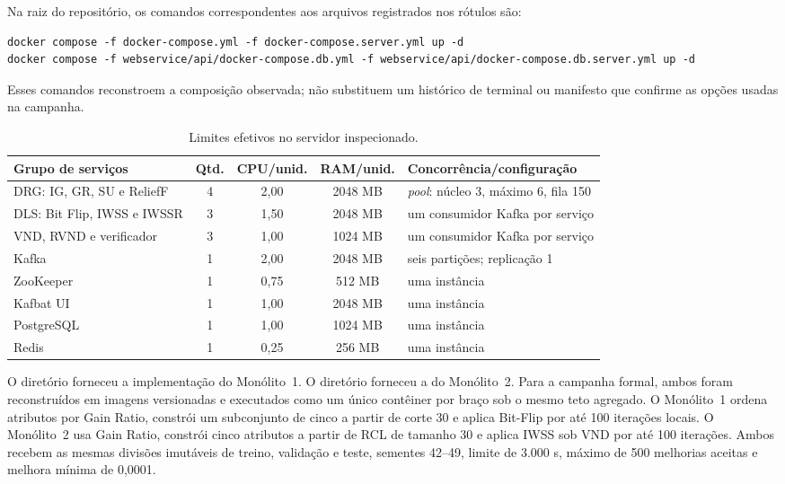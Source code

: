 Na raiz do repositório, os comandos correspondentes aos arquivos registrados nos rótulos são:
\begin{lstlisting}[basicstyle=\ttfamily\footnotesize,breaklines=true,columns=fullflexible]
docker compose -f docker-compose.yml -f docker-compose.server.yml up -d
docker compose -f webservice/api/docker-compose.db.yml -f webservice/api/docker-compose.db.server.yml up -d
\end{lstlisting}
Esses comandos reconstroem a composição observada; não substituem um histórico de terminal ou manifesto que confirme as opções usadas na campanha.

\begin{table}[!htb]
  \centering
  \scriptsize
  \caption{Limites efetivos no servidor inspecionado.}
  \label{tab:server-container-resources}
  \begin{tabularx}{\linewidth}{@{}Xc c c X@{}}
    \toprule
    \textbf{Grupo de serviços} & \textbf{Qtd.} & \textbf{CPU/unid.} & \textbf{RAM/unid.} & \textbf{Concorrência/configuração} \\
    \midrule
    DRG: IG, GR, SU e ReliefF & 4 & 2,00 & 2048 MB & \textit{pool}: núcleo 3, máximo 6, fila 150 \\
    DLS: Bit Flip, IWSS e IWSSR & 3 & 1,50 & 2048 MB & um consumidor Kafka por serviço \\
    VND, RVND e verificador & 3 & 1,00 & 1024 MB & um consumidor Kafka por serviço \\
    Kafka & 1 & 2,00 & 2048 MB & seis partições; replicação 1 \\
    ZooKeeper & 1 & 0,75 & 512 MB & uma instância \\
    Kafbat UI & 1 & 1,00 & 2048 MB & uma instância \\
    PostgreSQL & 1 & 1,00 & 1024 MB & uma instância \\
    Redis & 1 & 0,25 & 256 MB & uma instância \\
    \bottomrule
  \end{tabularx}
\end{table}

O diretório  forneceu a implementação do Monólito~1. O diretório  forneceu a do Monólito~2. Para a campanha formal, ambos foram reconstruídos em imagens versionadas e executados como um único contêiner por braço sob o mesmo teto agregado. O Monólito~1 ordena atributos por Gain Ratio, constrói um subconjunto de cinco a partir de corte 30 e aplica Bit-Flip por até 100 iterações locais. O Monólito~2 usa Gain Ratio, constrói cinco atributos a partir de RCL de tamanho 30 e aplica IWSS sob VND por até 100 iterações. Ambos recebem as mesmas divisões imutáveis de treino, validação e teste, sementes 42--49, limite de 3.000 s, máximo de 500 melhorias aceitas e melhora mínima de 0,0001.

